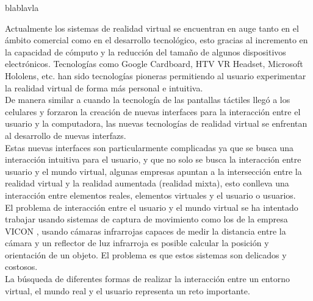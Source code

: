 
blablavla

Actualmente los sistemas de \gls{realidad virtual} se encuentran en auge tanto en el ámbito comercial como en el desarrollo tecnológico, esto gracias al incremento en la capacidad de cómputo y la reducción del tamaño de algunos dispositivos electrónicos. Tecnologías como Google Cardboard, HTV VR Headset, Microsoft Hololens, etc. han sido tecnologías pioneras permitiendo al usuario experimentar la realidad virtual de forma más personal e intuitiva.\\

De manera similar a cuando la tecnología de las pantallas táctiles llegó a los celulares y forzaron la creación de nuevas interfaces para la interacción entre el usuario y la computadora, las nuevas tecnologías de realidad virtual se enfrentan al desarrollo de nuevas \glspl{interfaz}.\\

Estas nuevas interfaces son particularmente complicadas ya que se busca una interacción intuitiva para el usuario, y que no solo se busca la interacción entre usuario y el mundo virtual, algunas empresas apuntan a la intersección entre la realidad virtual y la realidad aumentada (realidad mixta), esto conlleva una interacción entre elementos reales, elementos virtuales y el usuario o usuarios.\\

El problema de interacción entre el usuario y el mundo virtual se ha intentado trabajar usando sistemas de captura de movimiento como los de la empresa VICON \cite{vicon}, usando cámaras infrarrojas capaces de medir la distancia entre la cámara y un reflector de luz infrarroja es posible calcular la posición y orientación de un objeto. El problema es que estos sistemas son delicados y costosos.\\

La búsqueda de diferentes formas de realizar la interacción entre un entorno virtual, el mundo real y el usuario representa un reto importante.\\



